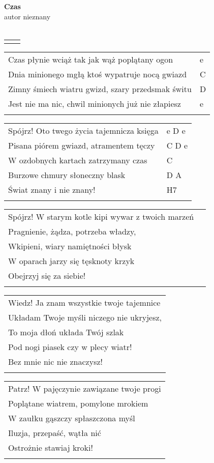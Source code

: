 \documentclass[a5paper]{article}
\begin{document}


\noindent
\fontsize{12pt}{15pt}\selectfont
\textbf{Czas} \\
\fontsize{8pt}{10pt}\selectfont
autor nieznany \\ \\
\fontsize{10pt}{12pt}\selectfont
{}
\begin{tabular}{@{}p{9.5cm}p{3cm}@{}}
\noindent
\end{tabular}

\noindent
\begin{tabular}{@{}p{8.5cm}p{3cm}@{}}
Czas płynie wciąż tak jak wąż poplątany ogon & e \\
Dnia minionego mgłą ktoś wypatruje nocą gwiazd & C \\
Zimny śmiech wiatru gwizd, szary przedsmak świtu & D \\
Jest nie ma nic, chwil minionych już nie złapiesz & e \\ \\
\end{tabular}

\noindent
\begin{tabular}{@{}p{9.5cm}p{3cm}@{}}
Spójrz! Oto twego życia tajemnicza księga & e D e \\
Pisana piórem gwiazd, atramentem tęczy & C D e \\
W ozdobnych kartach zatrzymany czas & C \\
Burzowe chmury  słoneczny blask & D A \\
Świat znany i nie znany! & H7 \\ \\
\end{tabular}

\noindent
\begin{tabular}{@{}p{9.5cm}p{3cm}@{}}
Spójrz! W starym kotle kipi wywar z twoich marzeń \\
Pragnienie, żądza, potrzeba władzy, \\
Wkipieni, wiary namiętności błysk \\
W oparach jarzy się tęsknoty krzyk \\
Obejrzyj się za siebie! \\ \\
\end{tabular}

\noindent
\begin{tabular}{@{}p{9.5cm}@{}}
Wiedz! Ja znam wszystkie twoje tajemnice \\
Układam Twoje myśli niczego nie ukryjesz, \\
To moja dłoń układa Twój szlak \\
Pod nogi piasek czy w plecy wiatr! \\
Bez mnie nic nie znaczysz! \\ \\
\end{tabular}

\noindent
\begin{tabular}{@{}p{9.5cm}@{}}
Patrz! W pajęczynie zawiązane twoje progi \\
Poplątane wiatrem, pomylone mrokiem \\
W zaułku gąszczy spłaszczona myśl \\
Iluzja, przepaść, wątła nić \\
Ostrożnie stawiaj kroki! \\ \\
\end{tabular}
\end{document}
